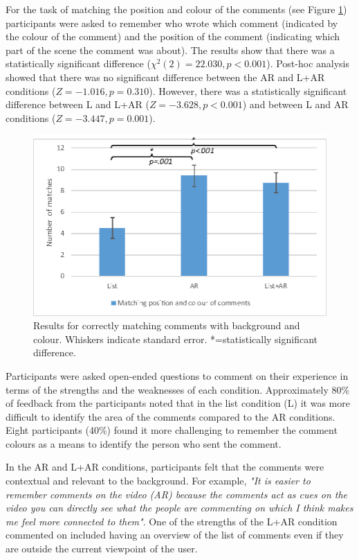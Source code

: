 For the task of matching the position and colour of the comments (see Figure \ref{fig:mgia16:questions_matching}) participants were asked to remember who wrote which comment (indicated by the colour of the comment) and the position of the comment (indicating which part of the scene the comment was about). The results show that there was a statistically significant difference ($\chi^2(2)=22.030, p<0.001$). Post-hoc analysis showed that there was no significant difference between the AR and L+AR conditions ($Z=-1.016, p=0.310$). However, there was a statistically significant difference between L and L+AR ($Z=-3.628, p<0.001$) and between L and AR conditions ($Z=-3.447, p=0.001$).

\begin{figure}[thb]
  \centering
  \includegraphics[width=.8\linewidth]{images/61-video-mgia16/matching-02.eps}
  \caption{Results for correctly matching comments with background and colour. Whiskers indicate standard error. *=statistically significant difference.}
    \label{fig:mgia16:questions_matching}
\end{figure}

Participants were asked open-ended questions to comment on their experience in terms of the strengths and the weaknesses of each condition. Approximately 80\% of feedback from the participants noted that in the list condition (L) it was more difficult to identify the area of the comments compared to the AR conditions. Eight participants (40\%) found it more challenging to remember the comment colours as a means to identify the person who sent the comment. 

In the AR and L+AR conditions, participants felt that the comments were contextual and relevant to the background. For example, \textit{"It is easier to remember comments on the video (AR) because the comments act as cues on the video you can directly see what the people are commenting on which I think makes me feel more connected to them"}. One of the strengths of the L+AR condition commented on included having an overview of the list of comments even if they are outside the current viewpoint of the user. 

